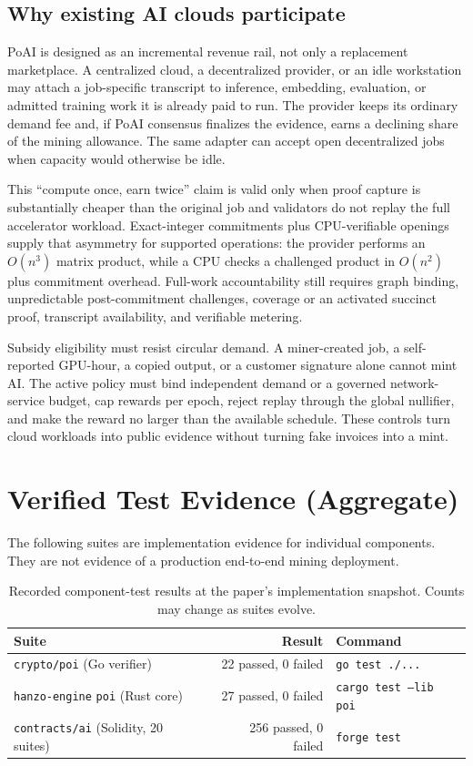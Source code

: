 \documentclass[11pt,a4paper]{article}
\begin{document}
\subsection{Why existing AI clouds participate}

PoAI is designed as an incremental revenue rail, not only a replacement marketplace. A centralized cloud, a decentralized provider, or an idle workstation may attach a job-specific transcript to inference, embedding, evaluation, or admitted training work it is already paid to run. The provider keeps its ordinary demand fee and, if PoAI consensus finalizes the evidence, earns a declining share of the mining allowance. The same adapter can accept open decentralized jobs when capacity would otherwise be idle.

This ``compute once, earn twice'' claim is valid only when proof capture is substantially cheaper than the original job and validators do not replay the full accelerator workload. Exact-integer commitments plus CPU-verifiable openings supply that asymmetry for supported operations: the provider performs an $O(n^3)$ matrix product, while a CPU checks a challenged product in $O(n^2)$ plus commitment overhead. Full-work accountability still requires graph binding, unpredictable post-commitment challenges, coverage or an activated succinct proof, transcript availability, and verifiable metering.

Subsidy eligibility must resist circular demand. A miner-created job, a self-reported GPU-hour, a copied output, or a customer signature alone cannot mint AI. The active policy must bind independent demand or a governed network-service budget, cap rewards per epoch, reject replay through the global nullifier, and make the reward no larger than the available schedule. These controls turn cloud workloads into public evidence without turning fake invoices into a mint.

\section{Verified Test Evidence (Aggregate)}\label{sec:evidence}

The following suites are implementation evidence for individual components. They are not evidence of a production end-to-end mining deployment.

\begin{table}[h]
\centering
\begin{tabular}{lrl}
\toprule
\textbf{Suite} & \textbf{Result} & \textbf{Command} \\
\midrule
\texttt{crypto/poi} (Go verifier) & 22 passed, 0 failed & \texttt{go test ./...} \\
\texttt{hanzo-engine} \texttt{poi} (Rust core) & 27 passed, 0 failed & \texttt{cargo test --lib poi} \\
\texttt{contracts/ai} (Solidity, 20 suites) & 256 passed, 0 failed & \texttt{forge test} \\
\bottomrule
\end{tabular}
\caption{Recorded component-test results at the paper's implementation snapshot. Counts may change as suites evolve.}
\end{table}
\end{document}
